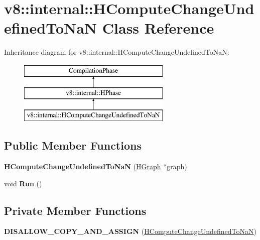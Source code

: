 \hypertarget{classv8_1_1internal_1_1_h_compute_change_undefined_to_na_n}{}\section{v8\+:\+:internal\+:\+:H\+Compute\+Change\+Undefined\+To\+NaN Class Reference}
\label{classv8_1_1internal_1_1_h_compute_change_undefined_to_na_n}
Inheritance diagram for v8\+:\+:internal\+:\+:H\+Compute\+Change\+Undefined\+To\+NaN\+:\begin{figure}[H]
\begin{center}
\leavevmode
\includegraphics[height=3.000000cm]{classv8_1_1internal_1_1_h_compute_change_undefined_to_na_n}
\end{center}
\end{figure}
\subsection*{Public Member Functions}
\begin{DoxyCompactItemize}
\item 
{\bfseries H\+Compute\+Change\+Undefined\+To\+NaN} (\hyperlink{classv8_1_1internal_1_1_h_graph}{H\+Graph} $\ast$graph)\hypertarget{classv8_1_1internal_1_1_h_compute_change_undefined_to_na_n_a7106bf1ec5f7e78f2be71aadbcd0203b}{}\label{classv8_1_1internal_1_1_h_compute_change_undefined_to_na_n_a7106bf1ec5f7e78f2be71aadbcd0203b}

\item 
void {\bfseries Run} ()\hypertarget{classv8_1_1internal_1_1_h_compute_change_undefined_to_na_n_a73d617bad7cdfbf02588d797abc82dbf}{}\label{classv8_1_1internal_1_1_h_compute_change_undefined_to_na_n_a73d617bad7cdfbf02588d797abc82dbf}

\end{DoxyCompactItemize}
\subsection*{Private Member Functions}
\begin{DoxyCompactItemize}
\item 
{\bfseries D\+I\+S\+A\+L\+L\+O\+W\+\_\+\+C\+O\+P\+Y\+\_\+\+A\+N\+D\+\_\+\+A\+S\+S\+I\+GN} (\hyperlink{classv8_1_1internal_1_1_h_compute_change_undefined_to_na_n}{H\+Compute\+Change\+Undefined\+To\+NaN})\hypertarget{classv8_1_1internal_1_1_h_compute_change_undefined_to_na_n_a815fd28f1591ce1ab0b2c13ba0e61453}{}\label{classv8_1_1internal_1_1_h_compute_change_undefined_to_na_n_a815fd28f1591ce1ab0b2c13ba0e61453}

\end{DoxyCompactItemize}
